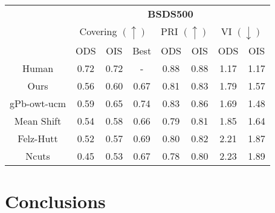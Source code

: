 \begin{table}[]
\centering
\begin{tabular}{c|c|c|c||c|c||c|c|}
\cline{2-8}
                                  & \multicolumn{7}{c|}{\textbf{BSDS500}}                                                                                       \\ \cline{2-8} 
                                  & \multicolumn{3}{c||}{Covering $(\uparrow)$} & \multicolumn{2}{c||}{PRI $(\uparrow)$} & \multicolumn{2}{c|}{VI $(\downarrow)$} \\ \cline{2-8} 
                                  & ODS          & OIS          & Best         & ODS               & OIS               & ODS                & OIS               \\ \hline
\multicolumn{1}{|c|}{Human}       & 0.72         & 0.72         & -            & 0.88              & 0.88              & 1.17               & 1.17              \\ \hline
\multicolumn{1}{|c|}{Ours}        & 0.56         & 0.60         & 0.67         & 0.81              & 0.83              & 1.79               & 1.57              \\ \hline
\multicolumn{1}{|c|}{gPb-owt-ucm} & 0.59         & 0.65         & 0.74         & 0.83              & 0.86              & 1.69               & 1.48              \\ \hline
\multicolumn{1}{|c|}{Mean Shift}  & 0.54         & 0.58         & 0.66         & 0.79              & 0.81              & 1.85               & 1.64              \\ \hline
\multicolumn{1}{|c|}{Felz-Hutt}   & 0.52         & 0.57         & 0.69         & 0.80              & 0.82              & 2.21               & 1.87              \\ \hline
\multicolumn{1}{|c|}{Ncuts}       & 0.45         & 0.53         & 0.67         & 0.78              & 0.80              & 2.23               & 1.89              \\ \hline
\end{tabular}
\end{table}




\section{Conclusions}



